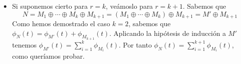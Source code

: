 \documentclass[twoside]{article}
\begin{document}
\begin{solucion}
\begin{enumerate}
\begin{itemize}
\begin{itemize}
\end{itemize}
\item Si suponemos cierto para $r=k$, veámoslo para $r=k+1$. Sabemos que
$$N=M_1 \oplus \cdots \oplus M_k \oplus M_{k+1} = (M_1 \oplus \cdots \oplus M_k) \oplus M_{k+1} = M' \oplus M_{k+1}$$
Como hemos demostrado el caso $k=2$, sabemos que $\phi_N(t)=\phi_{M'}(t)+\phi_{M_{k+1}}(t)$. Aplicando la hipótesis de inducción a $M'$ tenemos $\phi_{M'}(t)=\sum_{i=1}^k \phi_{M_i}(t)$. Por tanto $\phi_N(t)=\sum_{i=1}^{k+1}\phi_{M_i}(t)$, como queríamos probar.
\end{itemize}
\end{enumerate}
\end{solucion}
\end{document}
